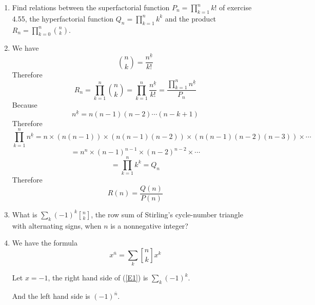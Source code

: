 \documentclass[12pt,a4paper]{article}
\makeatletter
\newtheorem*{solution}{Solution}
\theoremstyle{definition}
\renewenvironment{solution}[1][Solution] {\par\pushQED{\qed}\normalfont\topsep6\p@\@plus6\p@\relax\trivlist\item[\hskip\labelsep\bfseries#1\@addpunct{.}]\ignorespaces}{\popQED\endtrivlist\@endpefalse} \makeatother
\makeatother
\begin{document}
\begin{enumerate}
\begin{proof}
        \end{proof}
    \item 
    Find relations between the superfactorial function $P_n=\prod_{k=1}^{n} k!$ of exercise 4.55, the hyperfactorial function $Q_n=\prod_{k=1}^{n} k^k$ and the product $R_n=\prod_{k=0}^{n}\binom{n}{k}$.
    \begin{solution}
        We have
        \begin{equation*}
            \binom{n}{k}=\frac{n^{\underline{k}}}{k!}
        \end{equation*}
        Therefore
        \begin{equation*}
            R_n=\prod_{k=1}^{n}\binom{n}{k}=\prod_{k=1}^{n}\frac{n^{\underline{k}}}{k!}=\frac{\prod_{k=1}^{n}n^{\underline{k}}}{P_n}
        \end{equation*}
        Because
        \begin{equation*}
            n^{\underline{k}}=n(n-1)(n-2)\cdots(n-k+1)
        \end{equation*}
        Therefore
        \begin{equation*}
            \prod_{k=1}^{n}n^{\underline{k}}=n \times(n(n-1)) \times (n(n-1)(n-2)) \times (n(n-1)(n-2)(n-3))\times \cdots
        \end{equation*}
        \begin{equation*}
            =n^n \times (n-1)^{n-1} \times (n-2)^{n-2} \times \cdots
        \end{equation*}
        \begin{equation*}
            =\prod_{k=1}^{n} k^k=Q_n
        \end{equation*}
        Therefore
        \begin{equation*}
            R(n)=\frac{Q(n)}{P(n)}
        \end{equation*}
    \end{solution}
    \item
     What is $\sum_{k}(-1)^k {n \brack k}$, the row sum of Stirling's cycle-number triangle with alternating signs, when $n$ is a nonnegative integer?
       \begin{solution}
    	We have the formula
    	\begin{equation}\label{E1}
    	    x^{\overline{n}}=\sum_{k}{n \brack k}x^k
    	\end{equation}
    
    	Let $x=-1$, the right hand side of (\ref{E1}) is $\sum_{k}(-1)^k$.
    	
    	And the left hand side is $(-1)^{\overline{n}}$.
    	

\end{solution}
\end{enumerate}
\end{document}
